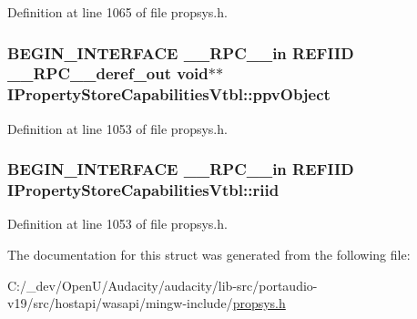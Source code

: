 Definition at line 1065 of file propsys.\+h.

\subsubsection[{\texorpdfstring{ppv\+Object}{ppvObject}}]{\setlength{\rightskip}{0pt plus 5cm}B\+E\+G\+I\+N\+\_\+\+I\+N\+T\+E\+R\+F\+A\+CE {\bf \+\_\+\+\_\+\+R\+P\+C\+\_\+\+\_\+in} {\bf R\+E\+F\+I\+ID} {\bf \+\_\+\+\_\+\+R\+P\+C\+\_\+\+\_\+deref\+\_\+out} {\bf void}$\ast$$\ast$ I\+Property\+Store\+Capabilities\+Vtbl\+::ppv\+Object}\hypertarget{struct_i_property_store_capabilities_vtbl_a31f85c5d3a296b5d621c8a5fdad29278}{}\label{struct_i_property_store_capabilities_vtbl_a31f85c5d3a296b5d621c8a5fdad29278}


Definition at line 1053 of file propsys.\+h.

\subsubsection[{\texorpdfstring{riid}{riid}}]{\setlength{\rightskip}{0pt plus 5cm}B\+E\+G\+I\+N\+\_\+\+I\+N\+T\+E\+R\+F\+A\+CE {\bf \+\_\+\+\_\+\+R\+P\+C\+\_\+\+\_\+in} {\bf R\+E\+F\+I\+ID} I\+Property\+Store\+Capabilities\+Vtbl\+::riid}\hypertarget{struct_i_property_store_capabilities_vtbl_aa97af34205077b4abe049d98a18295f1}{}\label{struct_i_property_store_capabilities_vtbl_aa97af34205077b4abe049d98a18295f1}


Definition at line 1053 of file propsys.\+h.



The documentation for this struct was generated from the following file\+:\begin{DoxyCompactItemize}
\item 
C\+:/\+\_\+dev/\+Open\+U/\+Audacity/audacity/lib-\/src/portaudio-\/v19/src/hostapi/wasapi/mingw-\/include/\hyperlink{propsys_8h}{propsys.\+h}\end{DoxyCompactItemize}
